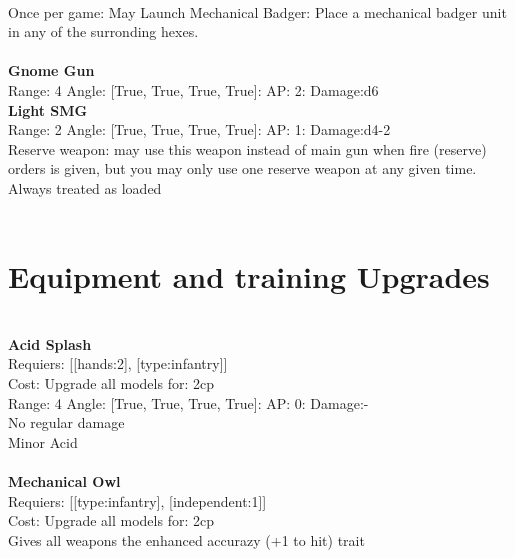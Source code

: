 \ \\
Once per game: May Launch Mechanical Badger: Place a mechanical badger unit in any of the surronding hexes. \\ 

\ \\
{\bf Gnome Gun } \\



Range: 4  Angle: [True, True, True, True]: AP: 2: Damage:d6 \\




{\bf Light SMG } \\



Range: 2  Angle: [True, True, True, True]: AP: 1: Damage:d4-2 \\
Reserve weapon: may use this weapon instead of main gun when fire (reserve) orders is given, but you may only use one reserve weapon at any given time.\\ 
Always treated as loaded\\ 




 
\ \\

\section{Equipment and training Upgrades}\ \\
{\bf Acid Splash } \\

Requiers: [[hands:2], [type:infantry]] \\
Cost: Upgrade all models for: 2cp \\


Range: 4  Angle: [True, True, True, True]: AP: 0: Damage:- \\
No regular damage\\ 
Minor Acid\\ 








\ \\
{\bf Mechanical Owl } \\

Requiers: [[type:infantry], [independent:1]] \\
Cost: Upgrade all models for: 2cp \\
Gives all weapons the enhanced accurazy (+1 to hit) trait\\ 









